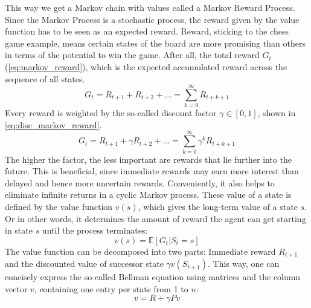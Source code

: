 \documentclass[12pt,a4paper]{article}
\begin{document}
This way we get a Markov chain with values called a Markov Reward Process.
Since the Markov Process is a stochastic process, the reward given by the value function has to be seen as an expected reward.
 Reward, sticking to the chess game example, means certain states of the board are more promising than others in terms of the potential to win the game. After all, the total reward $G_t$(\ref{eq:markov_reward}), which is the expected accumulated reward across the sequence of all states.
\begin{equation}
    \label{eq:markov_reward}
    G_t = R_{t+1} + R_{t+2} + ... = \sum_{k=0}^\infty R_{t+k+1}
\end{equation}
 Every reward is weighted by the so-called discount factor $\gamma \in [0, 1]$, shown in \ref{eq:disc_markov_reward}.
 \begin{equation}
    \label{eq:disc_markov_reward}
    G_t = R_{t+1} + \gamma R_{t+2} + ... = \sum_{k=0}^\infty \gamma^kR_{t+k+1}
 \end{equation}
 The higher the factor, the less important are rewards that lie further into the future. This is beneficial, since immediate rewards may earn more interest than delayed and hence more uncertain rewards. Conveniently, it also helps to eliminate infinite returns in a cyclic Markov process.
These value of a state is defined by the value function ${v(s)}$, which gives the long-term value of a state $s$. Or in other words, it determines the amount of reward the agent can get starting in state $s$ until the process terminates:
\begin{equation}
    \label{eq:value_func}
    v(s) = \mathbb{E}[G_t|S_t =s]
\end{equation}
The value function can be decomposed into two parts: Immediate reward $R_{t+1}$ and the discounted value of successor state ${\gamma v(S_{t+1})}$. This way, one can concisely express the so-called Bellman equation using matrices and the column vector $v$, containing one entry per state from 1 to $n$:
\begin{equation*}
    v = R + \gamma Pv
\end{equation*}
\end{document}

